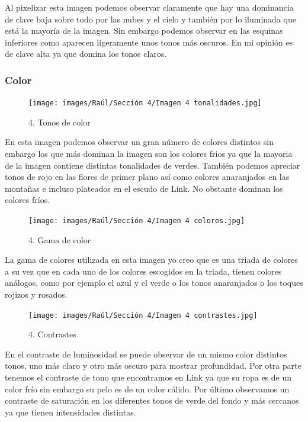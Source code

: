 \documentclass[12pt]{article}
\begin{document}
Al pixelizar esta imagen podemos observar claramente que hay una dominancia de clave baja sobre todo por las nubes y el cielo y también por lo iluminada que está la mayoría de la imagen. Sin embargo podemos observar en las esquinas inferiores como aparecen ligeramente unos tonos más oscuros. En mi opinión es de clave alta ya que domina los tonos claros.


        \subsubsection{Color}

\begin{figure}[H]
      \centering
      \texttt{[image: images/Raúl/Sección 4/Imagen 4 tonalidades.jpg]}
      \caption{\small 4. Tonos de color}
\end{figure}
En esta imagen podemos observar un gran número de colores distintos sin embargo los que más dominan la imagen son los colores frios ya que la mayoria de la imagen contiene distintas tonalidades de verdes. También podemos apreciar tonos de rojo en las flores de primer plano así como colores anaranjados en las montañas e incluso plateados en el escudo de Link. No obstante dominan los colores fríos.

\begin{figure}[H]
      \centering
      \texttt{[image: images/Raúl/Sección 4/Imagen 4 colores.jpg]}
      \caption{\small 4. Gama de color}
\end{figure}

La gama de colores utilizada en esta imagen yo creo que es una triada de colores a su vez que en cada uno de los colores escogidos en la triada, tienen colores análogos, como por ejemplo el azul y el verde o los tonos anaranjados o los toques rojizos y rosados.

\begin{figure}[H]
      \centering
      \texttt{[image: images/Raúl/Sección 4/Imagen 4 contrastes.jpg]}
      \caption{\small 4. Contrastes}
\end{figure}

En el contraste de luminosidad se puede observar de un mismo color distintos tonos, uno más claro y otro más oscuro para mostrar profundidad. Por otra parte tenemos el contraste de tono que encontramos en Link ya que su ropa es de un color frío sin embargo su pelo es de un color cálido. Por último observamos un contraste de saturación en los diferentes tonos de verde del fondo y más cercanos ya que tienen intensidades distintas.
\end{document}
